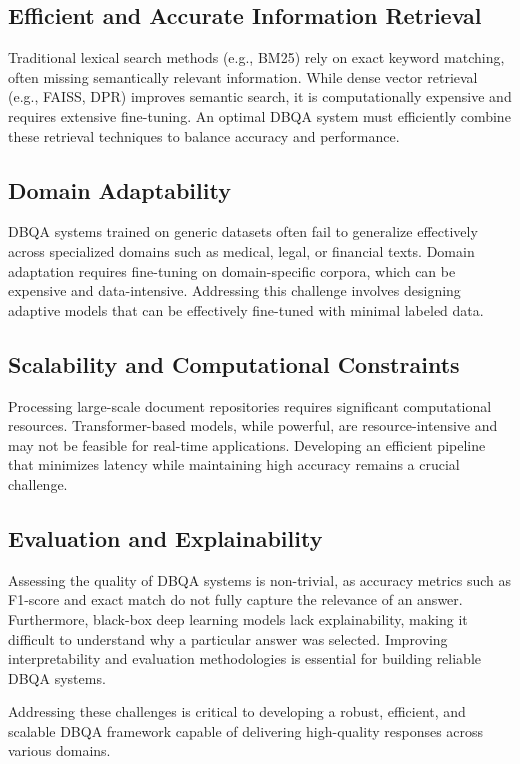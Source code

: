 \documentclass[sigconf]{acmart}
\begin{document}
\subsection{Efficient and Accurate Information Retrieval}
Traditional lexical search methods (e.g., BM25) rely on exact keyword matching, often missing semantically relevant information. While dense vector retrieval (e.g., FAISS, DPR) improves semantic search, it is computationally expensive and requires extensive fine-tuning. An optimal DBQA system must efficiently combine these retrieval techniques to balance accuracy and performance.

\subsection{Domain Adaptability}
DBQA systems trained on generic datasets often fail to generalize effectively across specialized domains such as medical, legal, or financial texts. Domain adaptation requires fine-tuning on domain-specific corpora, which can be expensive and data-intensive. Addressing this challenge involves designing adaptive models that can be effectively fine-tuned with minimal labeled data.

\subsection{Scalability and Computational Constraints}
Processing large-scale document repositories requires significant computational resources. Transformer-based models, while powerful, are resource-intensive and may not be feasible for real-time applications. Developing an efficient pipeline that minimizes latency while maintaining high accuracy remains a crucial challenge.

\subsection{Evaluation and Explainability}
Assessing the quality of DBQA systems is non-trivial, as accuracy metrics such as F1-score and exact match do not fully capture the relevance of an answer. Furthermore, black-box deep learning models lack explainability, making it difficult to understand why a particular answer was selected. Improving interpretability and evaluation methodologies is essential for building reliable DBQA systems.

Addressing these challenges is critical to developing a robust, efficient, and scalable DBQA framework capable of delivering high-quality responses across various domains.
\end{document}

